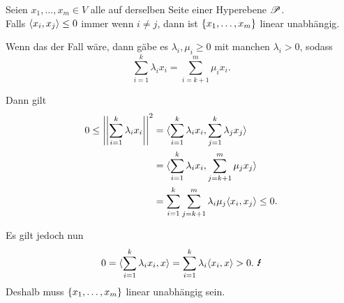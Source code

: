 \documentclass[18pt]{beamer}
\begin{document}
\begin{frame}
    \begin{satz} %
        Seien \( x_1, \ldots, x_m \in V \) alle auf derselben 
        Seite einer Hyperebene \( \mathscr{P} \). \\
        Falls \( \langle x_i, x_j \rangle \leq 0 \) immer wenn 
        \( i \neq j \), dann ist \( \{x_1, \ldots, x_m\} \) 
        linear unabhängig.
    \end{satz}

    \begin{bew}
        Wenn das der Fall wäre, dann gäbe es 
        \( \lambda_i, \mu_i \geq 0 \) mit 
        manchen \( \lambda_i > 0 \), sodass 
        \[ \sum_{i=1}^k \lambda_i x_i 
        = \sum_{i=k+1}^m \mu_i x_i. \]

        \renewcommand{\qedsymbol}{}
    \end{bew}
\end{frame}

\begin{frame}
    \begin{bew}
        Dann gilt 
        \begin{align*}
            0 \leq \norm{\sum_{i=1}^k \lambda_i x_i}^2 
            &= \scalarprod{\sum_{i=1}^{k} \lambda_{i} x_{i}}{
            \sum_{j=1}^{k} \lambda_{j} x_{j}} \\
            &= \scalarprod{\sum_{i=1}^{k} \lambda_{i} x_{i}}{
            \sum_{j=k+1}^{m} \mu_{j} x_{j}} \\
            &= \sum_{i=1}^{k} \sum_{j=k+1}^{m} \lambda_{i} \mu_{j}
            \scalarprod{x_i}{x_j} 
            \leq 0. %
        \end{align*}
        
        \renewcommand{\qedsymbol}{}
    \end{bew}
\end{frame}
\begin{frame}
    \begin{bew}
        Es gilt jedoch nun 
        \[ 0 = \scalarprod{\sum_{i=1}^{k} \lambda_i x_i}{x} 
        = \sum_{i=1}^k \lambda_i \scalarprod{x_i}{x} > 0. \text{ \Lightning{}} \]
        Deshalb muss \( \{x_1, \ldots, x_m\} \) linear 
        unabhängig sein.
    \end{bew}
\end{frame}
\end{document}

